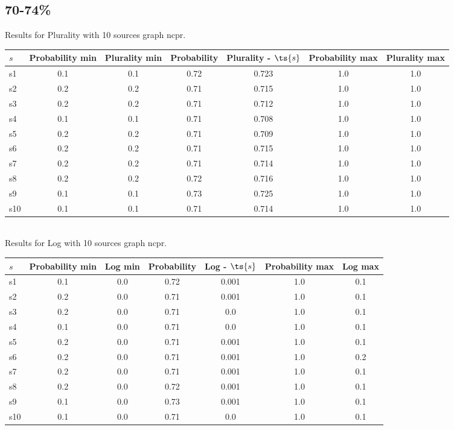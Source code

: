 \documentclass{article}
\begin{document}
\newpage

\subsection{70-74\%}

\noindent Results for Plurality with 10 sources graph ncpr.

\noindent\begin{tabular}{|l|c|c|c|c|c|c|}
\hline
$s$& Probability min & Plurality min & Probability & Plurality - $\ts{s}$ & Probability max & Plurality max\\
\hline
s1 &0.1 & 0.1 & 0.72 & 0.723 & 1.0 & 1.0\\
\hline
s2 &0.2 & 0.2 & 0.71 & 0.715 & 1.0 & 1.0\\
\hline
s3 &0.2 & 0.2 & 0.71 & 0.712 & 1.0 & 1.0\\
\hline
s4 &0.1 & 0.1 & 0.71 & 0.708 & 1.0 & 1.0\\
\hline
s5 &0.2 & 0.2 & 0.71 & 0.709 & 1.0 & 1.0\\
\hline
s6 &0.2 & 0.2 & 0.71 & 0.715 & 1.0 & 1.0\\
\hline
s7 &0.2 & 0.2 & 0.71 & 0.714 & 1.0 & 1.0\\
\hline
s8 &0.2 & 0.2 & 0.72 & 0.716 & 1.0 & 1.0\\
\hline
s9 &0.1 & 0.1 & 0.73 & 0.725 & 1.0 & 1.0\\
\hline
s10 &0.1 & 0.1 & 0.71 & 0.714 & 1.0 & 1.0\\
\hline
\end{tabular}\\

\noindent Results for Log with 10 sources graph ncpr.

\noindent\begin{tabular}{|l|c|c|c|c|c|c|}
\hline
$s$& Probability min & Log min & Probability & Log - $\ts{s}$ & Probability max & Log max\\
\hline
s1 &0.1 & 0.0 & 0.72 & 0.001 & 1.0 & 0.1\\
\hline
s2 &0.2 & 0.0 & 0.71 & 0.001 & 1.0 & 0.1\\
\hline
s3 &0.2 & 0.0 & 0.71 & 0.0 & 1.0 & 0.1\\
\hline
s4 &0.1 & 0.0 & 0.71 & 0.0 & 1.0 & 0.1\\
\hline
s5 &0.2 & 0.0 & 0.71 & 0.001 & 1.0 & 0.1\\
\hline
s6 &0.2 & 0.0 & 0.71 & 0.001 & 1.0 & 0.2\\
\hline
s7 &0.2 & 0.0 & 0.71 & 0.001 & 1.0 & 0.1\\
\hline
s8 &0.2 & 0.0 & 0.72 & 0.001 & 1.0 & 0.1\\
\hline
s9 &0.1 & 0.0 & 0.73 & 0.001 & 1.0 & 0.1\\
\hline
s10 &0.1 & 0.0 & 0.71 & 0.0 & 1.0 & 0.1\\
\hline
\end{tabular}\\
\end{document}
